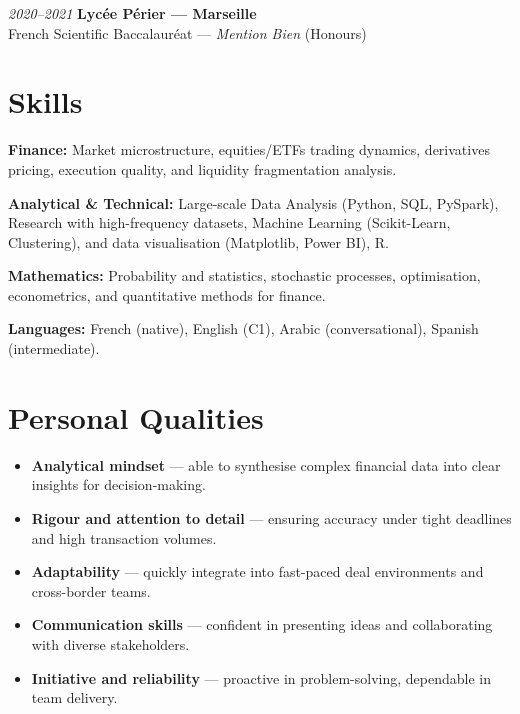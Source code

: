 \documentclass[a4paper,10pt]{article}
\begin{document}
\begin{minipage}[t]{0.45\textwidth}
\vspace{0.8em}

\textit{2020–2021} \textbf{Lycée Périer — Marseille} \\
French Scientific Baccalauréat — \textit{Mention Bien} (Honours)

\section*{Skills}

\noindent
\textbf{Finance:} Market microstructure, equities/ETFs trading dynamics, derivatives pricing, execution quality, and liquidity fragmentation analysis.  

\vspace{0.3em}

\noindent
\textbf{Analytical \& Technical:} Large-scale Data Analysis (Python, SQL, PySpark), Research with high-frequency datasets, Machine Learning (Scikit-Learn, Clustering), and data visualisation (Matplotlib, Power BI), R.

\vspace{0.3em}

\noindent
\textbf{Mathematics:} Probability and statistics, stochastic processes, optimisation, econometrics, and quantitative methods for finance.  

\vspace{0.3em}

\noindent
\textbf{Languages:} French (native), English (C1), Arabic (conversational), Spanish (intermediate).  


\section*{Personal Qualities}
\begin{itemize}[leftmargin=*]
   \item \textbf{Analytical mindset} — able to synthesise complex financial data into clear insights for decision-making.  
   \item \textbf{Rigour and attention to detail} — ensuring accuracy under tight deadlines and high transaction volumes.  
   \item \textbf{Adaptability} — quickly integrate into fast-paced deal environments and cross-border teams.  
   \item \textbf{Communication skills} — confident in presenting ideas and collaborating with diverse stakeholders.  
   \item \textbf{Initiative and reliability} — proactive in problem-solving, dependable in team delivery.  
\end{itemize}



\end{minipage}
\end{document}
